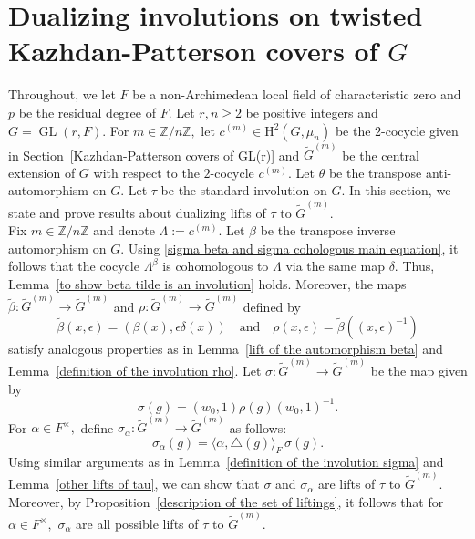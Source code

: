 \documentclass[11pt, a4paper, reqno]{amsart}
\theoremstyle{definition}
\theoremstyle{remark}
\theoremstyle{example}
\theoremstyle{note}
\numberwithin{equation}{section}
\DeclareMathOperator{\GL}{GL}
\begin{document}
\section{Dualizing involutions on twisted Kazhdan-Patterson covers of $G$} \label{Twisted covers}

Throughout, we let $F$ be a non-Archimedean local field of characteristic zero and  $p$ be the residual degree of $F.$ Let $r, n \geq 2$ be  positive integers and $G=\GL(r,F)$. For $m\in \mathbb{Z}/n\mathbb{Z},$ let $c^{(m)}\in \mathrm{H}^{2}(G, \mu_{n})$ be the $2$-cocycle given in Section~\ref{Kazhdan-Patterson covers of GL(r)} and $\widetilde{G}^{(m)}$ be the central extension of $G$ with respect to the $2$-cocycle $c^{(m)}$. 
Let $\theta$ be the transpose anti-automorphism on $G$. Let $\tau$ be the standard involution on $G.$
In this section, we state and prove results about dualizing lifts of $\tau$ to $\widetilde{G}^{(m)}$. \\

Fix $m\in \mathbb{Z}/n\mathbb{Z}$ and denote $\Lambda:=c^{(m)}$. Let $\beta$ be the transpose inverse automorphism on $G$. Using \eqref{sigma beta and sigma cohologous main equation}, it follows that the cocycle $\Lambda^\beta$ is cohomologous to $\Lambda$ via the same map $\delta$. Thus, Lemma~\ref{to show beta tilde is an involution} holds. Moreover, the maps $\tilde{\beta}:\widetilde{G}^{(m)}\rightarrow \widetilde{G}^{(m)}$ and $\rho: \widetilde{G}^{(m)} \to \widetilde{G}^{(m)}$ defined by $$\tilde{\beta} (x, \epsilon) = (\beta(x), \epsilon \delta(x)) \quad \text{and} \quad \rho(x, \epsilon) = \tilde{\beta}((x, \epsilon)^{-1})$$ satisfy analogous properties as in Lemma~\ref{lift of the automorphism beta} and Lemma~\ref{definition of the involution rho}.
Let $\sigma: \widetilde{G}^{(m)} \to \widetilde{G}^{(m)}$ be the map given by 
\[\sigma(g)=(w_{0},1) \rho(g) (w_{0},1)^{-1}.\]
For $\alpha \in F^{\times},$ define $\sigma_\alpha: \widetilde{G}^{(m)} \to \widetilde{G}^{(m)}$ as follows: 
$$\sigma_{\alpha}(g)= \langle \alpha, \triangle(g)\rangle_{F} \,\sigma(g).$$ 
Using similar arguments as in  Lemma~\ref{definition of the involution sigma} and Lemma~\ref{other lifts of tau}, we can show that $\sigma$ and $\sigma_{\alpha}$ are lifts of $\tau$ to $\widetilde{G}^{(m)}.$ Moreover, by Proposition~\ref{description of the set of liftings}, it follows that for $\alpha \in F^{\times},$  $\sigma_\alpha$ are all possible lifts of $\tau$ to $\widetilde{G}^{(m)}.$ \\
\end{document}
